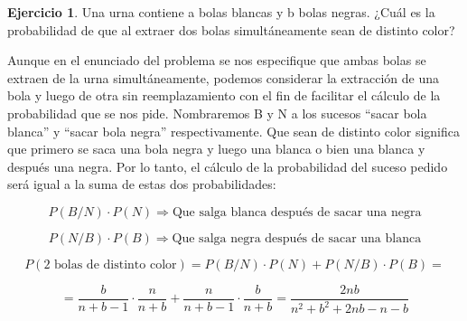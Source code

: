 \documentclass[a4paper, 12pt]{article}
\theoremstyle{definition}
\newtheorem{ej}{Ejercicio}
\begin{document}
\begin{ej}
Una urna contiene a bolas blancas y b bolas negras. ¿Cuál es la probabilidad de que al extraer
dos bolas simultáneamente sean de distinto color?

\medskip

Aunque en el enunciado del problema se nos especifique que ambas bolas se extraen de la urna simultáneamente, podemos considerar la extracción de una bola y luego de otra sin reemplazamiento con el fin  de facilitar el cálculo de la probabilidad que se nos pide. Nombraremos B y N a los sucesos ``sacar bola blanca'' y ``sacar bola negra'' respectivamente. Que sean de distinto color significa que primero se saca una bola negra y luego una blanca o bien una blanca y después una negra. Por lo tanto, el cálculo de la probabilidad del suceso pedido será igual a la suma de estas dos probabilidades:

\[
	P(B/N)\cdot P(N) \Rightarrow \text{Que salga blanca después de sacar una negra}
\]

\[
	P(N/B)\cdot P(B) \Rightarrow \text{Que salga negra después de sacar una blanca}
\]

\[
	P(\text{2 bolas de distinto color}) = P(B/N)\cdot P(N) + P(N/B)\cdot P(B) =
\]

\[
	= \frac{b}{n+b-1}\cdot\frac{n}{n+b} + \frac{n}{n+b-1}\cdot\frac{b}{n+b} = \frac{2nb}{n^2+b^2+2nb-n-b}
\]

\end{ej}

\medskip
\end{document}

